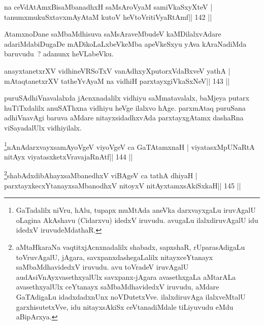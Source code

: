 \begin{shl}
na ceVdAtAmxBisaMbanadhxH saMsAroV\s yaM samiVkaSxyXteV |
tanumxmukuSxtavxmAyAtaM kutoV heVtoVritiVyaRtAmf\hfill || 142 ||
\end{shl}

\begin{artha}
AtamxnoDane saMbaMdhisuva saMsAraveMbudeV kaMDilalxvAdare adariMda\break biDugaDe mADikoLaLxbeVkeMba apeVkeSxyu yAva kAraNadiMda baruvudu~? adanunx heVLabeVku.
\end{artha}


\begin{shl}
anayxtanetxrXV vidhineVRSoTxV vanAdhxyXputorxVdaBxveV yathA |
mAtaqtanetxrXV tatheYvAyaM na vidhiH parxtayxgiVkaSxNeV\hfill || 143 ||
\end{shl}

\begin{artha}
puruSAdhiVnavalalxda jAcnxnadalilx vidhiyu saMmatavalalx, baMjeya putarx huTiTxdalilx anuSAThxna vidhiyu heVge ilalxvo hAge. parxmAtaq puruSana adhiVnavAgi baruva aMdare nitayxsidadhxvAda parxtayxgAtamx dashaRna viSayadalUlx vidhiyilalx.
\end{artha}


\begin{shl}
\footnote{GaTadalilx niVru, hAlu, tupapx muMtAda aneVka darxvayxgaLu iruvAgalU oLagina AkAshavu (Cidarxvu) idedxV iruvudu. avugaLu ilalxdiruvAgalU idu idedxV iruvudeMdathaR.}nAnAdarxvayxsamAyoVgeV viyoVgeV ca GaTAtamxnaH |
viyatasxMpUNaRtA nitAyx viyatasxketxVravajaRnAtf\hfill || 144 ||
\end{shl}

\begin{shl}
\footnote{aMtaHkaraNa vaqtitxjAcnxnadalilx shabadx, sapxshaR, rUparasAdigaLu toVruvAgalU, jAgara, savxpanxdashegaLalilx nitayxceYtanayx saMbaMdhavidedxV iruvudu. avu toVradeV iruvAgalU audAsiVnAyxvasethxyalUlx savxpanx-jAgara avasethxgaLa aMtarALa avasethxyalUlx ceYtanayx saMbaMdhavidedxV iruvudu, aMdare GaTAdigaLu idadxdadxnUnx noVDutetxVve. ilalxdiruvAga ilalxveMtalU garxhisutetxVve, idu nitayxsAkiSx ceVtanadiMdale tiLiyuvudu eMdu aBipArxya.}shabAdxdibAhayxsaMbanedhxV viBAgeV ca tathA dhiyaH |
parxtayxkecxYtanayxsaMbanodhxV nitoyxV nitAyxtamxsAkiSxkaH\hfill || 145 ||
\end{shl}


